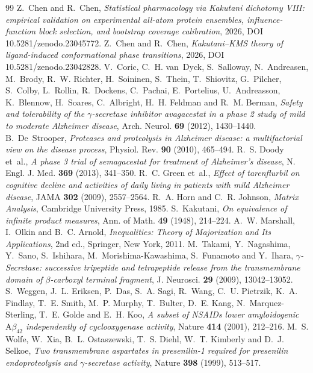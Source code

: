 \documentclass[11pt,reqno]{amsart}
\theoremstyle{plain}
\theoremstyle{definition}
\theoremstyle{remark}
\numberwithin{equation}{section}
\begin{document}
\begin{thebibliography}{99}
 Z.~Chen and R.~Chen, \emph{Statistical pharmacology via Kakutani dichotomy VIII: empirical validation on experimental all-atom protein ensembles, influence-function block selection, and bootstrap coverage calibration}, 2026, DOI 10.5281/zenodo.23045772.
 Z.~Chen and R.~Chen, \emph{Kakutani--KMS theory of ligand-induced conformational phase transitions}, 2026, DOI 10.5281/zenodo.23042828.
 V.~Coric, C.~H. van~Dyck, S.~Salloway, N.~Andreasen, M.~Brody, R.~W. Richter, H.~Soininen, S.~Thein, T.~Shiovitz, G.~Pilcher, S.~Colby, L.~Rollin, R.~Dockens, C.~Pachai, E.~Portelius, U.~Andreasson, K.~Blennow, H.~Soares, C.~Albright, H.~H. Feldman and R.~M. Berman, \emph{Safety and tolerability of the $\gamma$-secretase inhibitor avagacestat in a phase 2 study of mild to moderate Alzheimer disease}, Arch. Neurol. \textbf{69} (2012), 1430--1440.
 B.~De~Strooper, \emph{Proteases and proteolysis in Alzheimer disease: a multifactorial view on the disease process}, Physiol. Rev. \textbf{90} (2010), 465--494.
 R.~S. Doody et~al., \emph{A phase 3 trial of semagacestat for treatment of Alzheimer's disease}, N. Engl. J. Med. \textbf{369} (2013), 341--350.
 R.~C. Green et~al., \emph{Effect of tarenflurbil on cognitive decline and activities of daily living in patients with mild Alzheimer disease}, JAMA \textbf{302} (2009), 2557--2564.
 R.~A. Horn and C.~R. Johnson, \emph{Matrix Analysis}, Cambridge University Press, 1985.
 S.~Kakutani, \emph{On equivalence of infinite product measures}, Ann. of Math. \textbf{49} (1948), 214--224.
 A.~W. Marshall, I.~Olkin and B.~C. Arnold, \emph{Inequalities: Theory of Majorization and Its Applications}, 2nd ed., Springer, New York, 2011.
 M.~Takami, Y.~Nagashima, Y.~Sano, S.~Ishihara, M.~Morishima-Kawashima, S.~Funamoto and Y.~Ihara, \emph{$\gamma$-Secretase: successive tripeptide and tetrapeptide release from the transmembrane domain of $\beta$-carboxyl terminal fragment}, J. Neurosci. \textbf{29} (2009), 13042--13052.
 S.~Weggen, J.~L. Eriksen, P.~Das, S.~A. Sagi, R.~Wang, C.~U. Pietrzik, K.~A. Findlay, T.~E. Smith, M.~P. Murphy, T.~Bulter, D.~E. Kang, N.~Marquez-Sterling, T.~E. Golde and E.~H. Koo, \emph{A subset of NSAIDs lower amyloidogenic $\mathrm{A}\beta_{42}$ independently of cyclooxygenase activity}, Nature \textbf{414} (2001), 212--216.
 M.~S. Wolfe, W.~Xia, B.~L. Ostaszewski, T.~S. Diehl, W.~T. Kimberly and D.~J. Selkoe, \emph{Two transmembrane aspartates in presenilin-1 required for presenilin endoproteolysis and $\gamma$-secretase activity}, Nature \textbf{398} (1999), 513--517.

\end{thebibliography}
\end{document}
